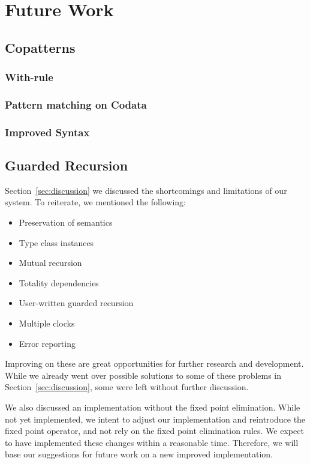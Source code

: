 \chapter{Future Work}
\label{cha:future-work}
\section{Copatterns}
\subsection{With-rule}
\subsection{Pattern matching on Codata}
\subsection{Improved Syntax}

% 
\section{Guarded Recursion}
\label{sec:guarded-recursion-1}
Section~\ref{sec:discussion} we discussed the shortcomings and limitations of
our system. To reiterate, we mentioned the following:

\begin{itemize}
\item Preservation of semantics
\item Type class instances
\item Mutual recursion
\item Totality dependencies
\item User-written guarded recursion
\item Multiple clocks
\item Error reporting
\end{itemize}

Improving on these are great opportunities for further research and
development. While we already went over possible solutions to some of these problems in
Section~\ref{sec:discussion}, some were left without further discussion.

We also discussed an implementation without the fixed point
elimination. While not yet implemented, we intent to adjust our implementation
and reintroduce the fixed point operator, and not rely on the fixed point elimination
rules. We expect to have implemented these changes within a reasonable
time. Therefore, we will base our suggestions for future work on a new
improved implementation.

